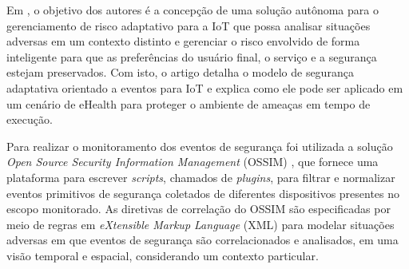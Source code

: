 \documentclass[tid,table]{texufpel} %
\begin{document}
Em \cite{aman14}, o objetivo dos autores é a concepção de uma solução autônoma para o gerenciamento de risco adaptativo para a IoT que possa analisar situações adversas em um contexto distinto e gerenciar o risco envolvido de forma inteligente para que as preferências do usuário final, o serviço e a segurança  estejam preservados. Com isto, o artigo detalha o modelo de segurança adaptativa orientado a eventos para IoT e explica como ele pode ser aplicado em um cenário de eHealth para proteger o ambiente de ameaças em tempo de execução.


 
Para realizar o monitoramento dos eventos de segurança foi utilizada a solução \textit{Open Source Security Information Management} (OSSIM) \cite{ossim18}, que fornece uma plataforma para escrever \textit{scripts}, chamados de \textit{plugins}, para filtrar e normalizar eventos primitivos de segurança coletados de diferentes dispositivos presentes no escopo monitorado. As diretivas de correlação do OSSIM são especificadas por meio de regras em \textit{eXtensible Markup Language} (XML) para modelar situações adversas em que eventos de segurança são correlacionados e analisados, em uma visão temporal e espacial, considerando um contexto particular. 
\end{document}
